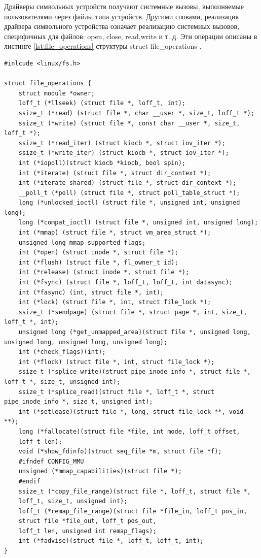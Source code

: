 Драйверы символьных устройств получают системные вызовы, выполняемые пользователями через файлы типа устройств.
Другими словами, реализация драйвера символьного устройства означает реализацию системных вызовов, специфичных для файлов: open, close, read,write и т. д.
Эти операции описаны в листинге \ref*{lst:file_operations} структуры struct file\_operations \cite{6}.
\begin{lstlisting}[caption=Структура struct file\_operations, label=lst:file_operations]
#inlcude <linux/fs.h>

struct file_operations {
	struct module *owner;
	loff_t (*llseek) (struct file *, loff_t, int);
	ssize_t (*read) (struct file *, char __user *, size_t, loff_t *);
	ssize_t (*write) (struct file *, const char __user *, size_t, loff_t *);
	ssize_t (*read_iter) (struct kiocb *, struct iov_iter *);
	ssize_t (*write_iter) (struct kiocb *, struct iov_iter *);
	int (*iopoll)(struct kiocb *kiocb, bool spin);
	int (*iterate) (struct file *, struct dir_context *);
	int (*iterate_shared) (struct file *, struct dir_context *);
	__poll_t (*poll) (struct file *, struct poll_table_struct *);
	long (*unlocked_ioctl) (struct file *, unsigned int, unsigned long);
	long (*compat_ioctl) (struct file *, unsigned int, unsigned long);
	int (*mmap) (struct file *, struct vm_area_struct *);
	unsigned long mmap_supported_flags;
	int (*open) (struct inode *, struct file *);
	int (*flush) (struct file *, fl_owner_t id);
	int (*release) (struct inode *, struct file *);
	int (*fsync) (struct file *, loff_t, loff_t, int datasync);
	int (*fasync) (int, struct file *, int);
	int (*lock) (struct file *, int, struct file_lock *);
	ssize_t (*sendpage) (struct file *, struct page *, int, size_t, loff_t *, int);
	unsigned long (*get_unmapped_area)(struct file *, unsigned long, unsigned long, unsigned long, unsigned long);
	int (*check_flags)(int);
	int (*flock) (struct file *, int, struct file_lock *);
	ssize_t (*splice_write)(struct pipe_inode_info *, struct file *, loff_t *, size_t, unsigned int);
	ssize_t (*splice_read)(struct file *, loff_t *, struct pipe_inode_info *, size_t, unsigned int);
	int (*setlease)(struct file *, long, struct file_lock **, void **);
	long (*fallocate)(struct file *file, int mode, loff_t offset,
	loff_t len);
	void (*show_fdinfo)(struct seq_file *m, struct file *f);
	#ifndef CONFIG_MMU
	unsigned (*mmap_capabilities)(struct file *);
	#endif
	ssize_t (*copy_file_range)(struct file *, loff_t, struct file *,
	loff_t, size_t, unsigned int);
	loff_t (*remap_file_range)(struct file *file_in, loff_t pos_in,
	struct file *file_out, loff_t pos_out,
	loff_t len, unsigned int remap_flags);
	int (*fadvise)(struct file *, loff_t, loff_t, int);
}
\end{lstlisting}

